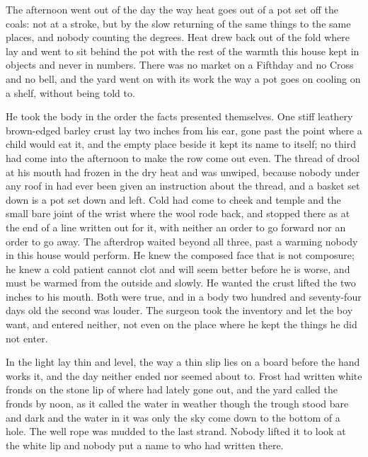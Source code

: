 The afternoon went out of the day the way heat goes out of a pot set off the coals: not at a stroke, but by the slow returning of the same things to the same places, and nobody counting the degrees. Heat drew back out of the fold where  lay and went to sit behind the pot with the rest of the warmth this house kept in objects and never in numbers. There was no market on a Fifthday and no Cross and no bell, and the yard went on with its work the way a pot goes on cooling on a shelf, without being told to.

He took the body in the order the facts presented themselves. One stiff leathery brown-edged barley crust lay two inches from his ear, gone past the point where a child would eat it, and the empty place beside it kept its name to itself; no third had come into the afternoon to make the row come out even. The thread of drool at his mouth had frozen in the dry heat and was unwiped, because nobody under any roof in  had ever been given an instruction about the thread, and a basket set down is a pot set down and left. Cold had come to cheek and temple and the small bare joint of the wrist where the wool rode back, and stopped there as at the end of a line written out for it, with neither an order to go forward nor an order to go away. The afterdrop waited beyond all three, past a warming nobody in this house would perform. He knew the composed face that is not composure; he knew a cold patient cannot clot and will seem better before he is worse, and must be warmed from the outside and slowly. He wanted the crust lifted the two inches to his mouth. Both were true, and in a body two hundred and seventy-four days old the second was louder. The surgeon took the inventory and let the boy want, and entered neither, not even on the place where he kept the things he did not enter.

\scenebreak

In  the light lay thin and level, the way a thin slip lies on a board before the hand works it, and the day neither ended nor seemed about to. Frost had written white fronds on the stone lip of  where  had lately gone out, and the yard called the fronds  by noon, as it called the water in  weather though the trough stood bare and dark and the water in it was only the sky come down to the bottom of a hole. The well rope was mudded to the last strand. Nobody lifted it to look at the white lip and nobody put a name to who had written there.

